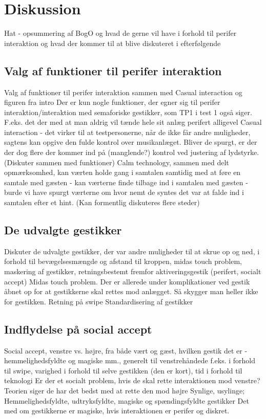 \chapter{Diskussion}
\label{SamletDiskussion}
%
Hat - opsummering af BogO og hvad de gerne vil have i forhold til perifer interaktion og hvad der kommer til at blive diskuteret i efterfølgende
%
\section{Valg af funktioner til perifer interaktion}
\label{DiskussionFunktionerCasualInteraction}
%
Valg af funktioner til perifer interaktion sammen med Casual interaction og figuren fra intro 
Der er kun nogle funktioner, der egner sig til perifer interaktion/interaktion med semaforiske gestikker, som TP1 i test 1 også siger. F.eks. det der med at man aldrig vil tænde hele sit anlæg perifert alligevel 
Casual interaction - det virker til at testpersonerne, når de ikke får andre muligheder, sagtens kan opgive den fulde kontrol over musikanlæget. Bliver de spurgt, er der der dog flere der kommer ind på (manglende?) kontrol ved justering af lydstyrke. (Diskuter sammen med funktioner)\blankline
%
Calm technology, sammen med delt opmærksomhed, kan værten holde gang i samtalen samtidig med at føre en samtale med gæsten - kan værterne finde tilbage ind i samtalen med gæsten - burde vi have spurgt værterne om hvor nemt de syntes det var at falde ind i samtalen efter et hint. (Kan formentlig diskuteres flere steder) \blankline
%
\section{De udvalgte gestikker}
\label{DiskussionUdvalgteGestikker}
%
Diskuter de udvalgte gestikker, der var andre muligheder til at skrue op og ned, i forhold til bevægelsesmængde og afstand til kroppen, midas touch problem, maskering af gestikker, retningsbestemt fremfor aktiveringsgestik (perifert, socialt accept)\blankline
%
Midas touch problem. Der er allerede under komplikationer ved gestik åbnet op for at gestikkerne skal rettes mod anlægget. Så skygger man heller ikke for gestikken.\blankline
%
Retning på swipe\blankline
%
Standardisering af gestikker
%
\section{Indflydelse på social accept}
\label{DiskussionSocialAccept}
%
Social accept, venstre vs. højre, fra både vært og gæst, hvilken gestik det er - hemmelighedsfyldte og magiske mm., generelt til venstrehåndede f.eks. i forhold til swipe, varighed i forhold til selve gestikken (den er kort), tid i forhold til teknologi
 Er der et socialt problem, hvis de skal rette interaktionen mod venstre? Teorien siger de har det bedst med at rette den mod højre
 Synlige, usylinge; Hemmelighedsfyldte, udtryksfyldte, 
	magiske og spændingsfyldte gestikker
	Det med om gestikkerne er magiske, hvis interaktionen er perifer og diskret. 
%
